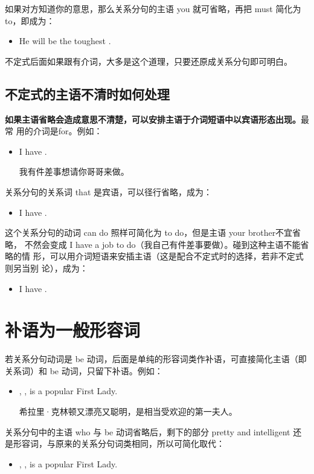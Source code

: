 如果对方知道你的意思，那么关系分句的主语 you 就可省略，再把 must 简化为
to，即成为：
\begin{itemize}
\item He will be the toughest  .
\end{itemize}

不定式后面如果跟有介词，大多是这个道理，只要还原成关系分句即可明白。

\subsection{不定式的主语不清时如何处理}

\textbf{如果主语省略会造成意思不清楚，可以安排主语于介词短语中以宾语形态出现。}最常
用的介词是for。例如：
\begin{itemize}
\item I have  .

  我有件差事想请你哥哥来做。
\end{itemize}
关系分句的关系词 that 是宾语，可以径行省略，成为：
\begin{itemize}
\item I have  .
\end{itemize}
这个关系分句的动词 can do 照样可简化为 to do，但是主语 your brother不宜省略，
不然会变成 I have a job to do（我自己有件差事要做）。碰到这种主语不能省略的情
形，可以用介词短语来安插主语（这是配合不定式时的选择，若非不定式则另当别
论），成为：
\begin{itemize}
\item I have  .
\end{itemize}

\section{补语为一般形容词}

若关系分句动词是 be
动词，后面是单纯的形容词类作补语，可直接简化主语（即关系词）和 be
动词，只留下补语。例如：

\begin{itemize}
\item {}, , is a popular First Lady.

  希拉里·克林顿又漂亮又聪明，是相当受欢迎的第一夫人。
\end{itemize}
关系分句中的主语 who 与 be 动词省略后，剩下的部分 pretty and intelligent
还是形容词，与原来的关系分句词类相同，所以可简化取代：
\begin{itemize}
\item {}, , is a popular First Lady.
\end{itemize}

